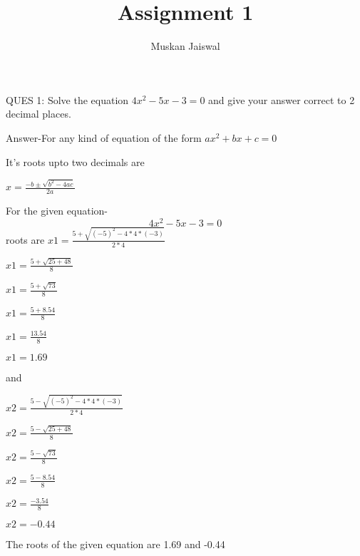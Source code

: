 \documentclass[12pt]{article}
\begin{document}
\title{ Assignment 1}
\author{Muskan Jaiswal}

\maketitle

QUES 1:  Solve the equation $4x^2-5x-3=0$ and give your answer correct to 2 decimal places.



Answer-For any kind of equation of the form  $ax^2+bx+c=0$

It's roots upto two decimals  are


$x=\frac{-b\pm\sqrt{b^2-4ac}}{2a}$

For the given equation-
\begin{equation}
    4x^2-5x-3=0
\end{equation}
roots are $x1=\frac{5+\sqrt{(-5)^2-4*4*(-3)}}{2*4}
$


$x1=\frac{5+\sqrt{25+48}}{8}
$

$x1=\frac{5+\sqrt{73}}{8}
$

$x1=\frac{5+8.54}{8}
$

$x1=\frac{13.54}{8}
$

$x1=1.69
$


and

$x2=\frac{5-\sqrt{(-5)^2-4*4*(-3)}}{2*4}
$

$x2=\frac{5-\sqrt{25+48}}{8}
$

$x2=\frac{5-\sqrt{73}}{8}
$

$x2=\frac{5-8.54}{8}
$

$x2=\frac{-3.54}{8}
$

$x2=-0.44
$

The roots of the given equation are 1.69 and -0.44
\end{document}
